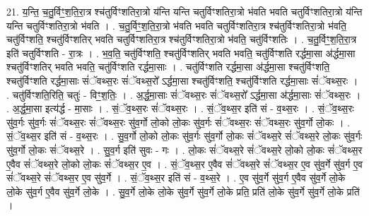 \documentclass[17pt]{extarticle}
\begin{document}
21. य॒न्ति॒ च॒तु॒र्विꣳ॒॒श॒ति॒रा॒त्र श्च॑तुर्विꣳशतिरा॒त्रो य॑न्ति यन्ति चतुर्विꣳशतिरा॒त्रो भ॑वति भवति चतुर्विꣳशतिरा॒त्रो य॑न्ति यन्ति चतुर्विꣳशतिरा॒त्रो भ॑वति । . च॒तु॒र्विꣳ॒॒श॒ति॒रा॒त्रो भ॑वति भवति चतुर्विꣳशतिरा॒त्र श्च॑तुर्विꣳशतिरा॒त्रो भ॑वति॒ चतु॑र्विꣳशति॒ श्चतु॑र्विꣳशतिर् भवति चतुर्विꣳशतिरा॒त्र श्च॑तुर्विꣳशतिरा॒त्रो भ॑वति॒ चतु॑र्विꣳशतिः । . च॒तु॒र्विꣳ॒॒श॒ति॒रा॒त्र इति॑ चतुर्विꣳशति - रा॒त्रः । . भ॒व॒ति॒ चतु॑र्विꣳशति॒ श्चतु॑र्विꣳशतिर् भवति भवति॒ चतु॑र्विꣳशति रर्द्धमा॒सा अ॑र्द्धमा॒सा श्चतु॑र्विꣳशतिर् भवति भवति॒ चतु॑र्विꣳशति रर्द्धमा॒साः । . चतु॑र्विꣳशति रर्द्धमा॒सा अ॑र्द्धमा॒सा श्चतु॑र्विꣳशति॒ श्चतु॑र्विꣳशति रर्द्धमा॒साः सं॑ॅवथ्स॒रः सं॑ॅवथ्स॒रो᳚ ऽर्द्धमा॒सा श्चतु॑र्विꣳशति॒ श्चतु॑र्विꣳशति रर्द्धमा॒साः सं॑ॅवथ्स॒रः । . चतु॑र्विꣳशति॒रिति॒ चतुः॑ - विꣳ॒॒श॒तिः॒ । . अ॒र्द्ध॒मा॒साः सं॑ॅवथ्स॒रः सं॑ॅवथ्स॒रो᳚ ऽर्द्धमा॒सा अ॑र्द्धमा॒साः सं॑ॅवथ्स॒रः । . अ॒र्द्ध॒मा॒सा इत्य॑र्द्ध - मा॒साः । . सं॒ॅव॒थ्स॒रः सं॑ॅवथ्स॒रः । . सं॒ॅव॒थ्स॒र इति॑ सं - व॒थ्स॒रः । . सं॒ॅव॒थ्स॒रः सु॑व॒र्गः सु॑व॒र्गः सं॑ॅवथ्स॒रः सं॑ॅवथ्स॒रः सु॑व॒र्गो लो॒को लो॒कः सु॑व॒र्गः सं॑ॅवथ्स॒रः सं॑ॅवथ्स॒रः सु॑व॒र्गो लो॒कः । . सं॒ॅव॒थ्स॒र इति॑ सं - व॒थ्स॒रः । . सु॒व॒र्गो लो॒को लो॒कः सु॑व॒र्गः सु॑व॒र्गो लो॒कः सं॑ॅवथ्स॒रे सं॑ॅवथ्स॒रे लो॒कः सु॑व॒र्गः सु॑व॒र्गो लो॒कः सं॑ॅवथ्स॒रे । . सु॒व॒र्ग इति॑ सुवः - गः । . लो॒कः सं॑ॅवथ्स॒रे सं॑ॅवथ्स॒रे लो॒को लो॒कः सं॑ॅवथ्स॒र ए॒वैव सं॑ॅवथ्स॒रे लो॒को लो॒कः सं॑ॅवथ्स॒र ए॒व । . सं॒ॅव॒थ्स॒र ए॒वैव सं॑ॅवथ्स॒रे सं॑ॅवथ्स॒र ए॒व सु॑व॒र्गे सु॑व॒र्ग ए॒व सं॑ॅवथ्स॒रे सं॑ॅवथ्स॒र ए॒व सु॑व॒र्गे । . सं॒ॅव॒थ्स॒र इति॑ सं - व॒थ्स॒रे । . ए॒व सु॑व॒र्गे सु॑व॒र्ग ए॒वैव सु॑व॒र्गे लो॒के लो॒के सु॑व॒र्ग ए॒वैव सु॑व॒र्गे लो॒के । . सु॒व॒र्गे लो॒के लो॒के सु॑व॒र्गे सु॑व॒र्गे लो॒के प्रति॒ प्रति॑ लो॒के सु॑व॒र्गे सु॑व॒र्गे लो॒के प्रति॑ । \newline
\end{document}
